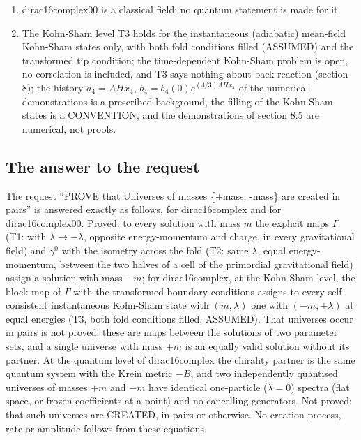 \documentclass[11pt]{article}
\begin{document}
\begin{enumerate}
\item dirac16complex00 is a classical field: no quantum statement is made for it.
\item The Kohn-Sham level T3 holds for the instantaneous (adiabatic) mean-field Kohn-Sham states only, with both fold conditions filled (ASSUMED) and the transformed tip condition; the time-dependent Kohn-Sham problem is open, no correlation is included, and T3 says nothing about back-reaction (section 8); the history $a_4 = AHx_4$, $b_4 = b_4(0)e^{(4/3)AHx_4}$ of the numerical demonstrations is a prescribed background, the filling of the Kohn-Sham states is a CONVENTION, and the demonstrations of section 8.5 are numerical, not proofs.
\end{enumerate}

\subsection{The answer to the request}

The request ``PROVE that Universes of masses \{+mass, -mass\} are created in pairs'' is answered exactly as follows, for dirac16complex and for dirac16complex00. Proved: to every solution with mass $m$ the explicit maps $\Gamma$ (T1: with $\lambda \to -\lambda$, opposite energy-momentum and charge, in every gravitational field) and $\gamma^0$ with the isometry across the fold (T2: same $\lambda$, equal energy-momentum, between the two halves of a cell of the primordial gravitational field) assign a solution with mass $-m$; for dirac16complex, at the Kohn-Sham level, the block map of $\Gamma$ with the transformed boundary conditions assigns to every self-consistent instantaneous Kohn-Sham state with $(m,\lambda)$ one with $(-m,+\lambda)$ at equal energies (T3, both fold conditions filled, ASSUMED). That universes occur in pairs is not proved: these are maps between the solutions of two parameter sets, and a single universe with mass $+m$ is an equally valid solution without its partner. At the quantum level of dirac16complex the chirality partner is the same quantum system with the Krein metric $-B$, and two independently quantised universes of masses $+m$ and $-m$ have identical one-particle ($\lambda = 0$) spectra (flat space, or frozen coefficients at a point) and no cancelling generators. Not proved: that such universes are CREATED, in pairs or otherwise. No creation process, rate or amplitude follows from these equations.
\end{document}
